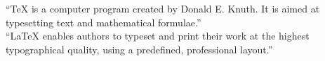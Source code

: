 

``\TeX{} is a computer program created by Donald E. Knuth. It is aimed at
typesetting text and mathematical formulae.'' \\
``\LaTeX{} enables authors to typeset and print their work at the highest
typographical quality, using a predefined, professional layout.''






